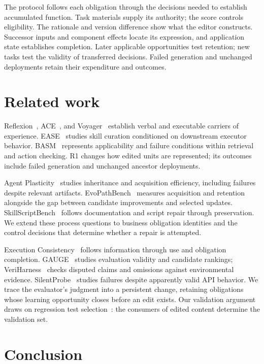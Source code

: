 \documentclass{ecai}
\begin{document}
The protocol follows each obligation through the decisions needed to establish accumulated function. Task materials supply its authority; the score controls eligibility. The rationale and version difference show what the editor constructs. Successor inputs and component effects locate its expression, and application state establishes completion. Later applicable opportunities test retention; new tasks test the validity of transferred decisions. Failed generation and unchanged deployments retain their expenditure and outcomes.

\section{Related work}

Reflexion~\cite{reflexion}, ACE~\cite{ace}, and Voyager~\cite{voyager} establish verbal and executable carriers of experience. EASE~\cite{xiong2026ease} studies skill curation conditioned on downstream executor behavior. BASM~\cite{lin2026basm} represents applicability and failure conditions within retrieval and action checking. R1 changes how edited units are represented; its outcomes include failed generation and unchanged ancestor deployments.

Agent Plasticity~\cite{singh2026agentplasticity} studies inheritance and acquisition efficiency, including failures despite relevant artifacts. EvoPathBench~\cite{lin2026beyondendpoint} measures acquisition and retention alongside the gap between candidate improvements and selected updates. SkillScriptBench~\cite{liu2026skillscriptbench} follows documentation and script repair through preservation. We extend these process questions to business obligation identities and the control decisions that determine whether a repair is attempted.

Execution Consistency~\cite{yu2026executionconsistency} follows information through use and obligation completion. GAUGE~\cite{bodhwani2026gauge} studies evaluation validity and candidate rankings; VeriHarness~\cite{zhang2026veriharness} checks disputed claims and omissions against environmental evidence. SilentProbe~\cite{li2026silentprobe} studies failures despite apparently valid API behavior. We trace the evaluator's judgment into a persistent change, retaining obligations whose learning opportunity closes before an edit exists. Our validation argument draws on regression test selection~\cite{ekstazi}: the consumers of edited content determine the validation set.

\section{Conclusion}
\end{document}
